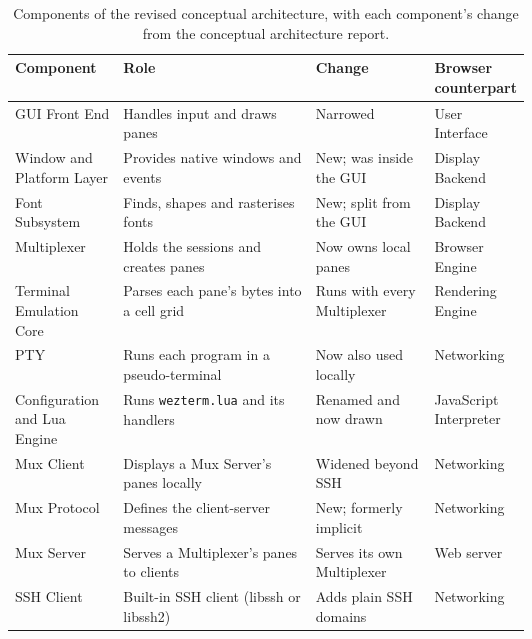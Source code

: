 \begin{table}[!htbp]
  \centering
  \caption{Components of the revised conceptual architecture, with each component's change from the conceptual architecture report.}
  \label{tab:components}
  \footnotesize
  \setlength{\tabcolsep}{4pt}
  \begin{tabularx}{\linewidth}{@{}>{\raggedright\arraybackslash}p{0.215\linewidth}>{\raggedright\arraybackslash}X>{\raggedright\arraybackslash}p{0.23\linewidth}>{\raggedright\arraybackslash}p{0.15\linewidth}@{}}
    \toprule
    \textbf{Component} & \textbf{Role} & \textbf{Change} & \textbf{Browser counterpart} \\
    \midrule
    GUI Front End & Handles input and draws panes & Narrowed & User Interface \\
    Window and Platform Layer & Provides native windows and events & New; was inside the GUI & Display Backend \\
    Font Subsystem & Finds, shapes and rasterises fonts & New; split from the GUI & Display Backend \\
    Multiplexer & Holds the sessions and creates panes & Now owns local panes & Browser Engine \\
    Terminal Emulation Core & Parses each pane's bytes into a cell grid & Runs with every Multiplexer & Rendering Engine \\
    PTY & Runs each program in a pseudo-terminal & Now also used locally & Networking \\
    Configuration and Lua Engine & Runs \texttt{wezterm.lua} and its handlers & Renamed and now drawn & JavaScript Interpreter \\
    Mux Client & Displays a Mux Server's panes locally & Widened beyond SSH & Networking \\
    Mux Protocol & Defines the client-server messages & New; formerly implicit & Networking \\
    Mux Server & Serves a Multiplexer's panes to clients & Serves its own Multiplexer & Web server \\
    SSH Client & Built-in SSH client (libssh or libssh2) & Adds plain SSH domains & Networking \\
    \bottomrule
  \end{tabularx}
\end{table}

